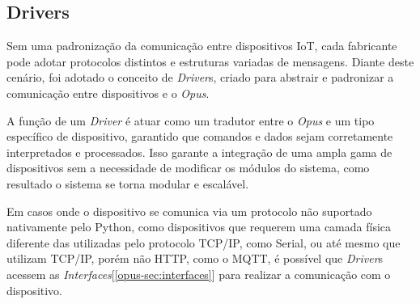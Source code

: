 \subsection{Drivers}

Sem uma padronização da comunicação entre dispositivos IoT, cada fabricante pode adotar protocolos distintos e estruturas variadas de mensagens.
Diante deste cenário, foi adotado o conceito de \emph{Driver}s, criado para abstrair e padronizar a comunicação entre dispositivos e o \emph{Opus}.

A função de um \emph{Driver} é atuar como um tradutor entre o \emph{Opus} e um tipo específico de dispositivo, garantido que comandos e dados
sejam corretamente interpretados e processados. Isso garante a integração de uma ampla gama de dispositivos sem a necessidade de modificar os 
módulos do sistema, como resultado o sistema se torna modular e escalável.

Em casos onde o dispositivo se comunica via um protocolo não suportado nativamente pelo Python, como dispositivos que requerem uma camada
física diferente das utilizadas pelo protocolo TCP/IP, como Serial, ou até mesmo que utilizam TCP/IP, porém não HTTP, como o MQTT,
é possível que \emph{Driver}s acessem as \emph{Interfaces}[\ref{opus-sec:interfaces}] para realizar a comunicação com o dispositivo.

